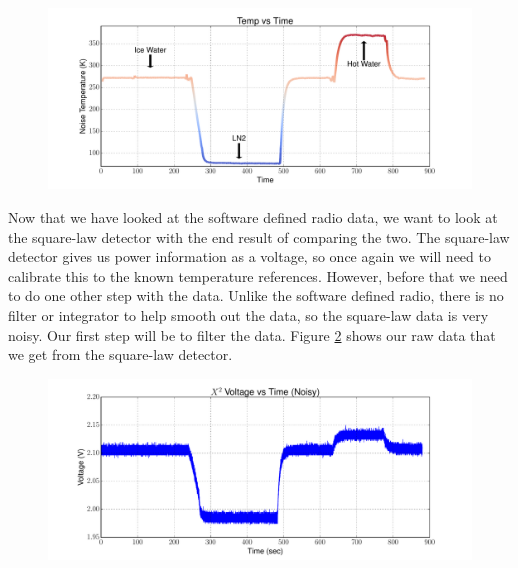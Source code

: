 \begin{figure}[h!tb] \centering

\includegraphics[width=\textwidth]{Experiments/Exp1/sdr_calibrated_color.pdf}

\label{SDR_Calibrated}
\end{figure}

Now that we have looked at the software defined radio data, we want to look at the square-law detector with the end result of comparing the two.  The square-law detector gives us power information as a voltage, so once again we will need to calibrate this to the known temperature references.  However, before that we need to do one other step with the data.  Unlike the software defined radio, there is no filter or integrator to help smooth out the data, so the square-law data is very noisy.  Our first step will be to filter the data.  Figure \ref{X2_Raw} shows our raw data that we get from the square-law detector.

\begin{figure}[h!tb] \centering

\includegraphics[width=\textwidth]{Experiments/Exp1/noisy_voltage.pdf}

\label{X2_Raw}
\end{figure}

